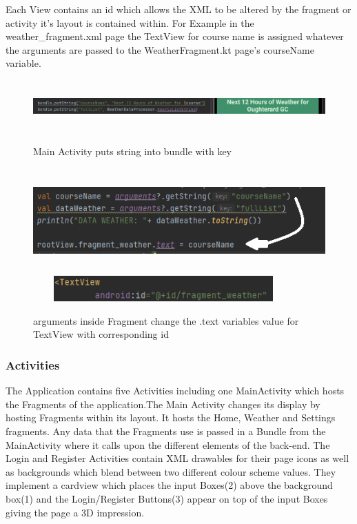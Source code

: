 Each View contains an id which allows the XML to be altered by the fragment or activity it's layout is contained within. For Example in the weather\_fragment.xml page the TextView for course name is assigned whatever the arguments are passed to the WeatherFragment.kt page's courseName variable. 

\begin{figure}[H]
    \centering
    \includegraphics[width=14cm, height = 2cm]{img/bundle arguments.PNG}
        \caption{Main Activity puts string into bundle with key}
    \includegraphics[width=12cm, height = 4cm]{img/fragment_arguments.PNG}
    \includegraphics[width=10cm, height = 1cm]{img/textview_id.PNG}
    \caption{arguments inside Fragment change the .text variables value for TextView with corresponding id}
    \label{fig:arguments inside Fragment change the .text variables value for TextView with corresponding id}
\end{figure}

\subsubsection{Activities}
The Application contains five Activities including one MainActivity which hosts the Fragments of the application.The Main Activity changes its display by hosting Fragments within its layout. It hosts the Home, Weather and Settings fragments. Any data that the Fragments use is passed in a Bundle from the MainActivity where it calls upon the different elements of the back-end. 
\newline
\newline
The Login and Register Activities contain XML drawables for their page icons as well as backgrounds which blend between two different colour scheme values. They implement a cardview which places the input Boxes(2)  above the background box(1) and the Login/Register Buttons(3) appear on top of the input Boxes giving the page a 3D impression. 

